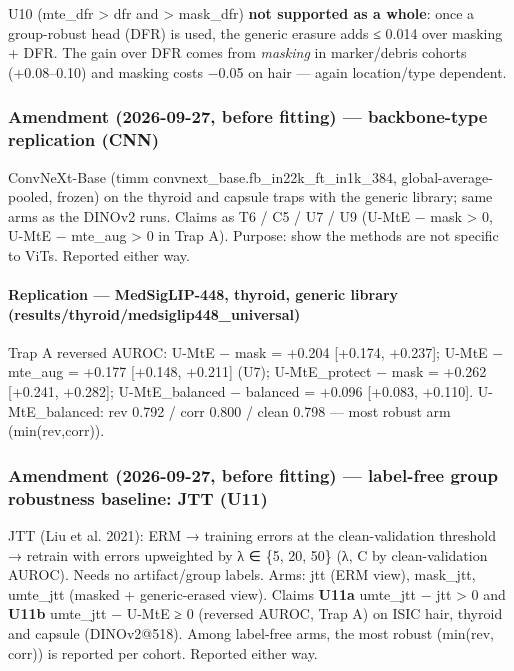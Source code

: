 {U10 (mte\_dfr \textgreater{} dfr and \textgreater{} mask\_dfr) \textbf{not supported as a whole}: once a group-robust head (DFR) is used, the
generic erasure adds ≤ 0.014 over masking + DFR. The gain over DFR comes from \emph{masking} in marker/debris cohorts
(+0.08--0.10) and masking costs −0.05 on hair --- again location/type dependent.

\subsubsection{Amendment (2026-09-27, before fitting) --- backbone-type replication (CNN)}\label{amendment-2026-09-27-before-fitting--backbone-type-replication-cnn}

ConvNeXt-Base (timm convnext\_base.fb\_in22k\_ft\_in1k\_384, global-average-pooled, frozen) on the thyroid and capsule
traps with the generic library; same arms as the DINOv2 runs. Claims as T6 / C5 / U7 / U9 (U-MtE − mask \textgreater{} 0,
U-MtE − mte\_aug \textgreater{} 0 in Trap A). Purpose: show the methods are not specific to ViTs. Reported either way.

\paragraph{Replication --- MedSigLIP-448, thyroid, generic library (results/thyroid/medsiglip448\_universal)}\label{replication--medsiglip-448-thyroid-generic-library-resultsthyroidmedsiglip448_universal}

Trap A reversed AUROC: U-MtE − mask = +0.204 {[}+0.174, +0.237{]}; U-MtE − mte\_aug = +0.177 {[}+0.148, +0.211{]} (U7);
U-MtE\_protect − mask = +0.262 {[}+0.241, +0.282{]}; U-MtE\_balanced − balanced = +0.096 {[}+0.083, +0.110{]}.
U-MtE\_balanced: rev 0.792 / corr 0.800 / clean 0.798 --- most robust arm (min(rev,corr)).

\subsubsection{Amendment (2026-09-27, before fitting) --- label-free group robustness baseline: JTT (U11)}\label{amendment-2026-09-27-before-fitting--label-free-group-robustness-baseline-jtt-u11}

JTT (Liu et al. 2021): ERM → training errors at the clean-validation threshold → retrain with errors upweighted by
λ ∈ \{5, 20, 50\} (λ, C by clean-validation AUROC). Needs no artifact/group labels. Arms: jtt (ERM view), mask\_jtt,
umte\_jtt (masked + generic-erased view). Claims \textbf{U11a} umte\_jtt − jtt \textgreater{} 0 and \textbf{U11b} umte\_jtt − U-MtE ≥ 0
(reversed AUROC, Trap A) on ISIC hair, thyroid and capsule (DINOv2@518). Among label-free arms, the most robust
(min(rev, corr)) is reported per cohort. Reported either way.

}

